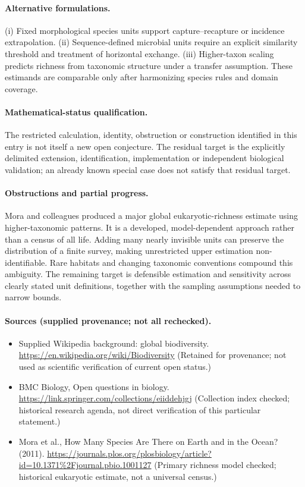 \documentclass[11pt]{article}
\begin{document}
\paragraph{Alternative formulations.} (i) Fixed morphological species units support capture--recapture or incidence extrapolation. (ii) Sequence-defined microbial units require an explicit similarity threshold and treatment of horizontal exchange. (iii) Higher-taxon scaling predicts richness from taxonomic structure under a transfer assumption. These estimands are comparable only after harmonizing species rules and domain coverage.

\paragraph{Mathematical-status qualification.} The restricted calculation, identity, obstruction or construction identified in this entry is not itself a new open conjecture. The residual target is the explicitly delimited extension, identification, implementation or independent biological validation; an already known special case does not satisfy that residual target.

\paragraph{Obstructions and partial progress.} Mora and colleagues produced a major global eukaryotic-richness estimate using higher-taxonomic patterns. It is a developed, model-dependent approach rather than a census of all life. Adding many nearly invisible units can preserve the distribution of a finite survey, making unrestricted upper estimation non-identifiable. Rare habitats and changing taxonomic conventions compound this ambiguity. The remaining target is defensible estimation and sensitivity across clearly stated unit definitions, together with the sampling assumptions needed to narrow bounds.

\paragraph{Sources (supplied provenance; not all rechecked).} \begin{itemize}
\item Supplied Wikipedia background: global biodiversity. \url{https://en.wikipedia.org/wiki/Biodiversity} (Retained for provenance; not used as scientific verification of current open status.)
\item BMC Biology, Open questions in biology. \url{https://link.springer.com/collections/eiiddehjgj} (Collection index checked; historical research agenda, not direct verification of this particular statement.)
\item Mora et al., How Many Species Are There on Earth and in the Ocean? (2011). \url{https://journals.plos.org/plosbiology/article?id=10.1371%2Fjournal.pbio.1001127} (Primary richness model checked; historical eukaryotic estimate, not a universal census.)
\end{itemize}
\end{document}
